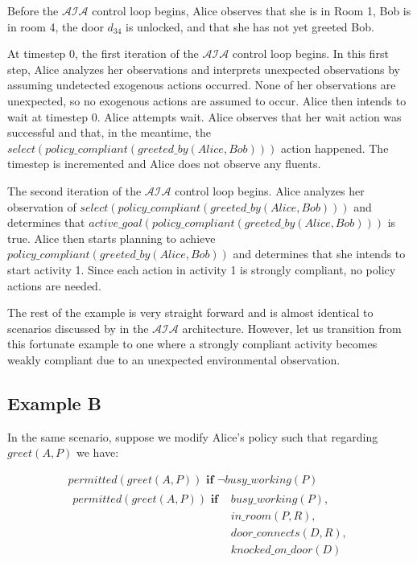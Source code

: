 Before the $\mathcal{AIA}$ control loop begins, Alice observes that she is in Room 1, Bob is in room 4, the door $d_{34}$ is unlocked, and that she has not yet greeted Bob.

At timestep 0, the first iteration of the $\mathcal{AIA}$ control loop begins.
In this first step, Alice analyzes her observations and interprets unexpected observations by assuming undetected exogenous actions occurred.
None of her observations are unexpected, so no exogenous actions are assumed to occur.
Alice then intends to wait at timestep 0.
Alice attempts wait.
Alice observes that her wait action was successful and that, in the meantime, the $select(policy\_compliant(greeted\_by(Alice, Bob)))$ action happened.
The timestep is incremented and Alice does not observe any fluents.

The second iteration of the $\mathcal{AIA}$ control loop begins.
Alice analyzes her observation of $select(policy\_compliant(greeted\_by(Alice, Bob)))$ and determines that $active\_goal(policy\_compliant(greeted\_by(Alice, Bob)))$ is true.
Alice then starts planning to achieve $policy\_compliant(greeted\_by(Alice, Bob))$ and determines that she intends to start activity 1.
Since each action in activity 1 is strongly compliant, no policy actions are needed.

The rest of the example is very straight forward and is almost identical to scenarios discussed by \citet{blount_architecture_2013,blount_towards_2014} in the $\mathcal{AIA}$ architecture.
However, let us transition from this fortunate example to one where a strongly compliant activity becomes weakly compliant due to an unexpected environmental observation.

\subsection{Example B}

In the same scenario, suppose we modify Alice's policy such that regarding $greet(A, P)$ we have:

\begin{gather}
    permitted(greet(A, P)) \textbf{ if }
        \neg busy\_working(P) \\
    \begin{split}
        permitted(greet(A, P)) \textbf{ if }
            & busy\_working(P), \\
            & in\_room(P, R), \\
            & door\_connects(D, R), \\
            & knocked\_on\_door(D)
    \end{split}
\end{gather}

